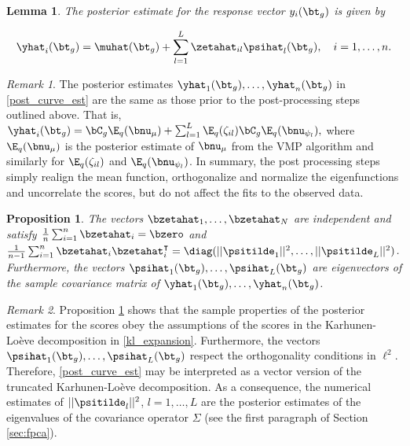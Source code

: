 \documentclass[12pt]{article}
\def\numu{\bnu_\mu}
\newcommand\nupsi[1]{\bnu_{\psi_{#1}}}
\theoremstyle{plain}
\newtheorem{lemma}[theorem]{Lemma}
\newtheorem{proposition}[theorem]{Proposition}
\theoremstyle{definition}
\theoremstyle{remark}
\newtheorem*{remark}{Remark}
\begin{document}
\begin{lemma}
	
	The posterior estimate for the response vector $y_i (\bt_g)$ is given by
	
	\begin{equation}
		\yhat_i (\bt_g) = \muhat (\bt_g) + \sum_{l=1}^L \zetahat_{il} \psihat_l (\bt_g), \quad i = 1, \dots, n.
	\label{post_curve_est}
	\end{equation}
	
\label{lem:response_est}
\end{lemma}

\begin{remark}
	
	The posterior estimates $\yhat_1 (\bt_g), \dots, \yhat_n (\bt_g)$ in \eqref{post_curve_est} are
	the same as those prior to the post-processing steps outlined above. That is,
	$\yhat_i (\bt_g) = \bC_g \E_q (\numu) + \sum_{l=1}^L \E_q (\zeta_{il}) \bC_g \E_q (\nupsi{l}),$
	where $\E_q (\numu)$ is the posterior estimate of $\numu$ from the VMP algorithm and similarly for
	$\E_q (\zeta_{il})$ and $\E_q (\nupsi{l})$. In summary, the post processing steps simply realign the mean function,
	orthogonalize and normalize the eigenfunctions and uncorrelate the scores, but do not affect the fits to the
	observed data.
	
\end{remark}

\begin{proposition}
	
	The vectors $\bzetahat_1, \dots, \bzetahat_N$ are independent and satisfy $\frac{1}{n} \sum_{i=1}^n \bzetahat_i =
	\bzero$ and $\frac{1}{n-1} \sum_{i=1}^n \bzetahat_i \bzetahat^{\intercal}_i = \diag (
	|| \psitilde_1 ||^2, \dots, || \psitilde_L ||^2)$.
	Furthermore, the vectors $\psihat_1 (\bt_g), \dots, \psihat_L (\bt_g)$ are eigenvectors of the sample
	covariance matrix of $\yhat_1 (\bt_g), \dots, \yhat_n (\bt_g)$.
	
\label{prop:bi_orthogonal}
\end{proposition}

\begin{remark}
	
	Proposition \ref{prop:bi_orthogonal} shows that the sample properties of the posterior estimates for the scores
	obey the assumptions of the scores in the Karhunen-Lo\`{e}ve decomposition in \eqref{kl_expansion}.
	Furthermore, the vectors $\psihat_1 (\bt_g), \dots, \psihat_L (\bt_g)$ respect the orthogonality conditions in $\ell^2$.
	Therefore, \eqref{post_curve_est} may be interpreted as a vector version of the truncated
	Karhunen-Lo\`{e}ve decomposition. As a consequence, the numerical estimates of
	$|| \psitilde_l ||^2$, $l = 1, \dots, L$ are the posterior estimates of the eigenvalues of the covariance operator
	$\Sigma$ (see the first paragraph of Section \ref{sec:fpca}).
	
\end{remark}
\end{document}
